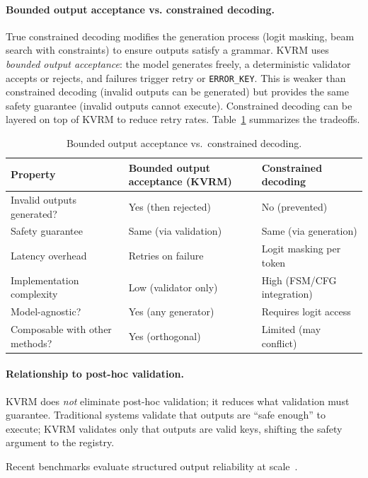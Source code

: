 \documentclass[11pt]{article}
\begin{document}
\paragraph{Bounded output acceptance vs. constrained decoding.}
True constrained decoding modifies the generation process (logit masking, beam search with constraints) to ensure outputs satisfy a grammar.
KVRM uses \emph{bounded output acceptance}: the model generates freely, a deterministic validator accepts or rejects, and failures trigger retry or \texttt{ERROR\_KEY}.
This is weaker than constrained decoding (invalid outputs can be generated) but provides the same safety guarantee (invalid outputs cannot execute).
Constrained decoding can be layered on top of KVRM to reduce retry rates.
Table~\ref{tab:decoding_comparison} summarizes the tradeoffs.

\begin{table}[h]
\centering
\caption{Bounded output acceptance vs.\ constrained decoding.}
\label{tab:decoding_comparison}
\begin{tabular}{lp{5.0cm}p{5.0cm}}
\toprule
Property & Bounded output acceptance (KVRM) & Constrained decoding \\
\midrule
Invalid outputs generated? & Yes (then rejected) & No (prevented) \\
Safety guarantee & Same (via validation) & Same (via generation) \\
Latency overhead & Retries on failure & Logit masking per token \\
Implementation complexity & Low (validator only) & High (FSM/CFG integration) \\
Model-agnostic? & Yes (any generator) & Requires logit access \\
Composable with other methods? & Yes (orthogonal) & Limited (may conflict) \\
\bottomrule
\end{tabular}
\end{table}

\paragraph{Relationship to post-hoc validation.}
KVRM does \emph{not} eliminate post-hoc validation; it reduces what validation must guarantee.
Traditional systems validate that outputs are ``safe enough'' to execute; KVRM validates only that outputs are valid keys, shifting the safety argument to the registry.

Recent benchmarks evaluate structured output reliability at scale~\cite{cooper2025structured,agrawal2024solm}.
\end{document}
